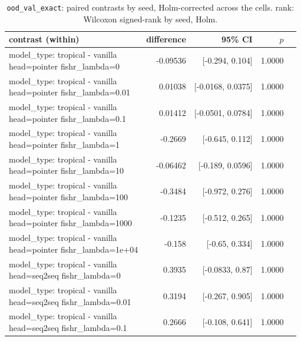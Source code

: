 \documentclass[10pt]{article}
\makeatletter
\newcommand{\stackcell}[1]{\begin{tabular}[t]{@{}l@{}}#1\end{tabular}}
\makeatother
\begin{document}
{\small
\begin{longtable}{lrrrl}
\caption{\texttt{ood\_val\_exact}: paired contrasts by seed, Holm-corrected across the cells. rank: Wilcoxon signed-rank by seed, Holm.}\label{tab:paired-ood_val_exact}\\
\toprule
contrast (within) & difference & 95\% CI & $p$ & \\
\midrule
\endhead
\stackcell{model\_type: tropical - vanilla\\\footnotesize head=pointer fishr\_lambda=0 } & -0.09536 & [-0.294, 0.104] & 1.0000 & \\
\stackcell{model\_type: tropical - vanilla\\\footnotesize head=pointer fishr\_lambda=0.01 } & 0.01038 & [-0.0168, 0.0375] & 1.0000 & \\
\stackcell{model\_type: tropical - vanilla\\\footnotesize head=pointer fishr\_lambda=0.1 } & 0.01412 & [-0.0501, 0.0784] & 1.0000 & \\
\stackcell{model\_type: tropical - vanilla\\\footnotesize head=pointer fishr\_lambda=1 } & -0.2669 & [-0.645, 0.112] & 1.0000 & \\
\stackcell{model\_type: tropical - vanilla\\\footnotesize head=pointer fishr\_lambda=10 } & -0.06462 & [-0.189, 0.0596] & 1.0000 & \\
\stackcell{model\_type: tropical - vanilla\\\footnotesize head=pointer fishr\_lambda=100 } & -0.3484 & [-0.972, 0.276] & 1.0000 & \\
\stackcell{model\_type: tropical - vanilla\\\footnotesize head=pointer fishr\_lambda=1000 } & -0.1235 & [-0.512, 0.265] & 1.0000 & \\
\stackcell{model\_type: tropical - vanilla\\\footnotesize head=pointer fishr\_lambda=1e+04 } & -0.158 & [-0.65, 0.334] & 1.0000 & \\
\stackcell{model\_type: tropical - vanilla\\\footnotesize head=seq2seq fishr\_lambda=0 } & 0.3935 & [-0.0833, 0.87] & 1.0000 & \\
\stackcell{model\_type: tropical - vanilla\\\footnotesize head=seq2seq fishr\_lambda=0.01 } & 0.3194 & [-0.267, 0.905] & 1.0000 & \\
\stackcell{model\_type: tropical - vanilla\\\footnotesize head=seq2seq fishr\_lambda=0.1 } & 0.2666 & [-0.108, 0.641] & 1.0000 & \\

\end{longtable}}
\end{document}
